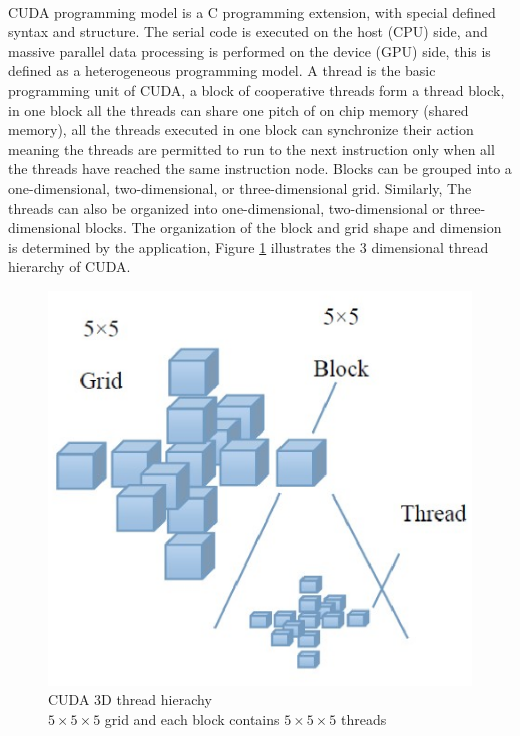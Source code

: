 \documentclass[12pt,a4paper,final]{article}
\begin{document}
\begin{spacing}{2.5}
\paragraph{}CUDA programming model is a C programming extension, with special defined syntax and structure. The serial code is executed on the host (CPU) side, and massive parallel data processing is performed on the device (GPU) side, this is defined as a heterogeneous programming model. A thread is the basic programming unit of CUDA, a block of cooperative threads form a thread block, in one block all the threads can share one pitch of on chip memory (shared memory), all the threads executed in one block can synchronize their action meaning the threads are permitted to run to the next instruction only when all the threads have reached the same instruction node. Blocks can be grouped into a one-dimensional, two-dimensional, or three-dimensional grid. Similarly, The threads can also be organized into one-dimensional, two-dimensional or three-dimensional blocks. The organization of the block and grid shape and dimension is determined by the application, Figure \ref{figure1} illustrates the 3 dimensional thread hierarchy of CUDA.
\begin{figure}[htb]
\centering
\includegraphics[scale=0.7]{CUDA_programming_hierachy.eps}
\caption{CUDA 3D thread hierachy\\ $5\times 5\times 5$ grid and each block contains $5\times 5\times 5$ threads\\}
\label{figure1}
\end{figure}


\end{spacing}
\end{document}

